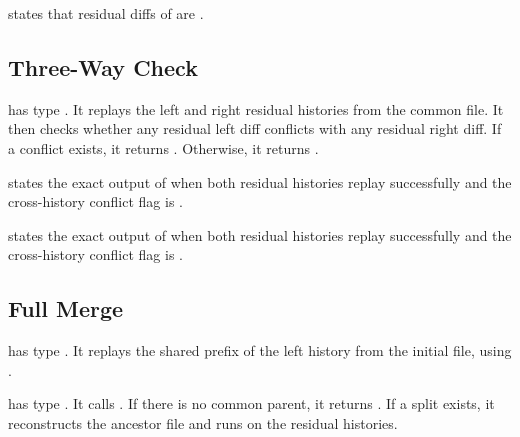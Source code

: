 \begin{theorem}
 states that residual diffs of 
are .
\end{theorem}

\subsection{Three-Way Check}

\begin{definition}[threeWayCheck]
\code{[threeWayCheck]} has type
.
It replays the left and right residual histories from the common file. It then
checks whether any residual left diff conflicts with any residual right diff.
If a conflict exists, it returns . Otherwise,
it returns .
\end{definition}

\begin{theorem}
 states the exact output of
 when both residual histories replay successfully and the
cross-history conflict flag is .
\end{theorem}

\begin{theorem}
 states the exact output of
 when both residual histories replay successfully and the
cross-history conflict flag is .
\end{theorem}

\subsection{Full Merge}

\begin{definition}[reconstructAncestor]
\code{[reconstructAncestor]} has type
. It replays
the shared prefix of the left history from the initial file, using
.
\end{definition}

\begin{definition}[fullMerge]
\code{[fullMerge]} has type
.
It calls . If there is no common parent, it
returns . If a split exists, it reconstructs the ancestor file and
runs  on the residual histories.
\end{definition}

